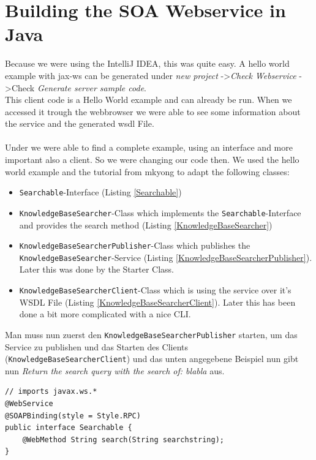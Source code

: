 \documentclass[12pt]{article}
\begin{document}
\section{Building the SOA Webservice in Java}
\label{sec:ws}
Because we were using the IntelliJ IDEA, this was quite easy.
A hello world example with jax-ws can be generated under \textit{new project} -\textgreater \textit{Check Webservice } -\textgreater Check \textit{Generate server sample code}. \\
This client code is a Hello World example and can already be run. When we accessed it trough the webbrowser we were able to see some information about the service and the generated wsdl File.\\
\\
Under \cite{mkyongjaxwsexample} we were able to find a complete example, using an interface and more important also a client. So we were changing our code then. We used the hello world example and the tutorial from mkyong to adapt the following classes:\\
\begin{itemize}
\item \texttt{Searchable}-Interface (Listing \ref{Searchable})
\item \texttt{KnowledgeBaseSearcher}-Class which implements the \texttt{Searchable}-Interface and provides the search method (Listing \ref{KnowledgeBaseSearcher})
\item \texttt{KnowledgeBaseSearcherPublisher}-Class which publishes the \texttt{KnowledgeBaseSearcher}-Service  (Listing \ref{KnowledgeBaseSearcherPublisher}). Later this was done by the Starter Class.
\item \texttt{KnowledgeBaseSearcherClient}-Class which is using the service over it's WSDL File (Listing \ref{KnowledgeBaseSearcherClient}). Later this has been done a bit more complicated with a nice CLI.
\end{itemize}
Man muss nun zuerst den \texttt{KnowledgeBaseSearcherPublisher} starten, um das Service zu publishen und das Starten des Clients (\texttt{KnowledgeBaseSearcherClient}) und das unten angegebene Beispiel nun gibt nun
\textit{Return the search query with the search of: blabla} aus.

\begin{lstlisting}[caption=Searchable interface, label=Searchable]
// imports javax.ws.*
@WebService
@SOAPBinding(style = Style.RPC)
public interface Searchable {
    @WebMethod String search(String searchstring);
}
\end{lstlisting}
\end{document}
